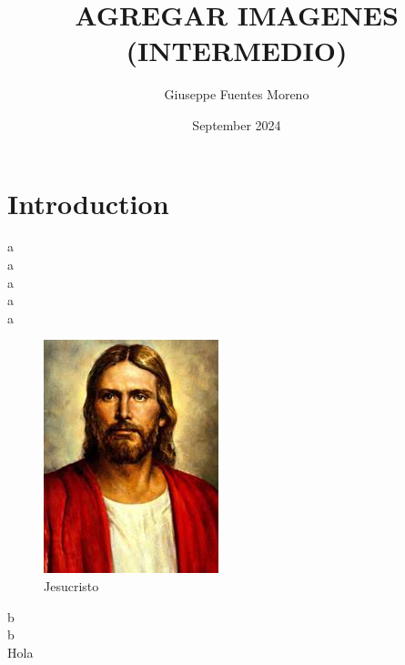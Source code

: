 \documentclass{article}
\title{AGREGAR IMAGENES (INTERMEDIO)}
\author{Giuseppe Fuentes Moreno}
\date{September 2024}
\begin{document}
\maketitle

\section{Introduction}
a\\ %
a\\
a\\
a\\
a
\begin{figure}[H]
    \centering
    \includegraphics[width=0.3\linewidth]{descarga.jpeg}
    \caption{Jesucristo}
    \label{fig_1}
\end{figure}
b\\
b\\
\newpage %
Hola
\end{document}
